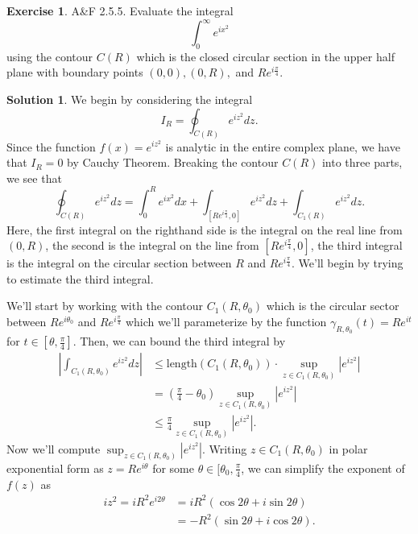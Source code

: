 \documentclass[12pt]{article}
\newcommand{\abs}[1]{ \left| #1 \right| }
\theoremstyle{definition}
\newtheorem{exer}{Exercise}
\newtheorem{sol}{Solution}
\theoremstyle{remark}
\begin{document}
\newpage

\begin{exer}
    A\&F 2.5.5. Evaluate the integral
    \begin{equation}
        \int_0^\infty e^{ix^2} 
    \end{equation}
    using the contour $C(R)$ which is the closed circular section in the upper half plane with boundary points $(0,0), (0,R),$ and $Re^{i\frac{\pi}{4}}$.
\end{exer}
\begin{sol}
We begin by considering the integral
\begin{equation}
    I_R = \oint_{C(R)} e^{iz^2}dz.
\end{equation}
Since the function $f(x)=e^{iz^2}$ is analytic in the entire complex plane, we have that $I_R = 0$ by Cauchy Theorem.  Breaking the contour $C(R)$ into three parts, we see that 
\begin{equation}
    \label{eq:3_parts}
    \oint_{C(R)} e^{iz^2}dz = \int_{0}^{R} e^{ix^2}dx + \int_{[Re^{i\frac{\pi}{4}},0]} e^{iz^2}dz + \int_{C_1(R)} e^{iz^2}dz. 
\end{equation}
Here, the first integral on the righthand side is the integral on the real line from $(0,R)$, the second is the integral on the line from $[Re^{i\frac{\pi}{4}},0]$, the third integral is the integral on the circular section between $R$ and $Re^{i\frac{\pi}{4}}$. We'll begin by trying to estimate the third integral.

We'll start by working with the contour $C_1(R,\theta_0)$ which is the circular sector between $Re^{i\theta_0}$ and $Re^{i\frac{\pi}{4}}$ which we'll parameterize by the function $\gamma_{R,\theta_0}(t) = Re^{it}$ for $t\in [\theta, \frac{\pi}{4}]$. Then, we can bound the third integral by
\begin{align}
\abs{\int_{C_1(R,\theta_0)} e^{iz^2}dz} &\leq \text{length}(C_1(R,\theta_0)) \cdot \sup_{z\in C_1(R,\theta_0)} \abs{e^{iz^2}}\\
                                           &= \left(\frac{\pi}{4}-\theta_0 \right)\sup_{z\in C_1(R,\theta_0)} \abs{e^{iz^2}} \\
                                           &\leq \frac{\pi}{4}\sup_{z\in C_1(R,\theta_0)} \abs{e^{iz^2}}.
\end{align}
Now we'll compute $\sup_{z\in C_1(R,\theta_0)} \abs{e^{iz^2}}$. Writing $z\in C_1(R,\theta_0)$ in polar exponential form as $z=Re^{i\theta}$ for some $\theta \in [\theta_0, \frac{\pi}{4}$, we can simplify the exponent of $f(z)$ as
\begin{align}
    iz^2 = iR^2 e^{i 2\theta} &= iR^2(\cos2\theta + i\sin2\theta)\\
                              &= -R^2(\sin2\theta + i\cos2\theta).
\end{align}


\end{sol}
\end{document}

